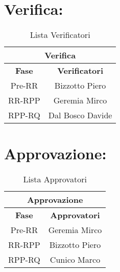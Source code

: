 \section*{\LARGE Verifica:}
 
\begin{table}[!h]
  \begin{center}
    \begin{tabular}
      {|c|c|}
      \hline
      \multicolumn{2}{|c|}{ \textbf{Verifica} } \\
      \hline
      \textbf{Fase} & \textbf{Verificatori} \\
      \hline
      {Pre-RR} & Bizzotto Piero \\
      \hline
      {RR-RPP} & Geremia Mirco \\
      \hline
      {RPP-RQ} & Dal Bosco Davide \\
      \hline
    \end{tabular}
    \caption{Lista Verificatori} %
    \label{tabverifica}
  \end{center}
\end{table}
\textbf{}  

\newpage
\section*{\LARGE Approvazione:}
 
\begin{table}[!h]
  \begin{center}
    \begin{tabular}
      {|c|c|}
      \hline
      \multicolumn{2}{|c|}{ \textbf{Approvazione} } \\
      \hline
      \textbf{Fase} & \textbf{Approvatori} \\
      \hline
      {Pre-RR} & Geremia Mirco \\
      \hline
      {RR-RPP} & Bizzotto Piero\\
      \hline
      {RPP-RQ} & Cunico Marco\\
      \hline
    \end{tabular}
    \caption{Lista Approvatori} %
    \label{tabapprovazione}
  \end{center}
\end{table}
\textbf{}
 
